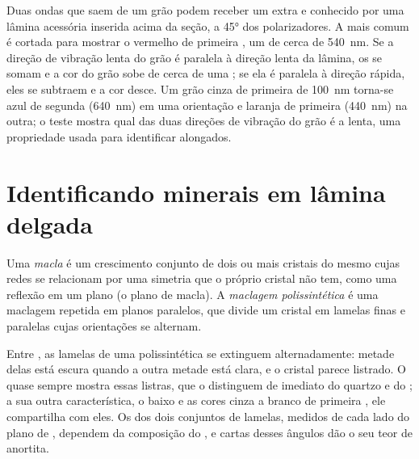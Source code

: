Duas ondas que saem de um grão podem receber um  extra e conhecido por uma lâmina acessória inserida acima da seção, a \ang{45} dos polarizadores. A mais comum é cortada para mostrar o vermelho de primeira , um  de cerca de \qty{540}{nm}. Se a direção de vibração lenta do grão é paralela à direção lenta da lâmina, os  se somam e a cor do grão sobe de cerca de uma ; se ela é paralela à direção rápida, eles se subtraem e a cor desce. Um grão cinza de primeira  de \qty{100}{nm} torna-se azul de segunda  (\qty{640}{nm}) em uma orientação e laranja de primeira  (\qty{440}{nm}) na outra; o teste mostra qual das duas direções de vibração do grão é a lenta, uma propriedade usada para identificar  alongados.

\section{Identificando minerais em lâmina delgada}

\begin{definition}\label{def:b1:optical-mineralogy:twin}
Uma \emph{macla} é um crescimento conjunto de dois ou mais cristais do mesmo  cujas redes se relacionam por uma simetria que o próprio cristal não tem, como uma reflexão em um plano (o plano de macla). A \emph{maclagem polissintética} é uma maclagem repetida em planos paralelos, que divide um cristal em lamelas finas e paralelas cujas orientações se alternam.
\end{definition}

Entre , as lamelas de uma  polissintética se extinguem alternadamente: metade delas está escura quando a outra metade está clara, e o cristal parece listrado. O  quase sempre mostra essas listras, que o distinguem de imediato do quartzo e do ; a sua outra característica, o  baixo e as cores cinza a branco de primeira , ele compartilha com eles. Os  dos dois conjuntos de lamelas, medidos de cada lado do plano de , dependem da composição do , e cartas desses ângulos dão o seu teor de anortita.

